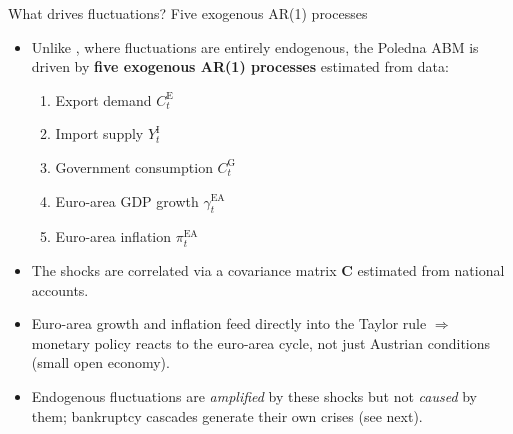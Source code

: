 \documentclass[9pt]{beamer}
\begin{document}
\begin{frame}{What drives fluctuations? Five exogenous AR(1) processes}
    \begin{itemize}
        \item Unlike \cite{assenza_emergent_2015}, where fluctuations are entirely endogenous, the Poledna ABM is driven by \textbf{five exogenous AR(1) processes} estimated from data:
        \begin{enumerate}\footnotesize
            \item Export demand $C^{\mathrm{E}}_t$
            \item Import supply $Y^{\mathrm{I}}_t$
            \item Government consumption $C^{\mathrm{G}}_t$
            \item Euro-area GDP growth $\gamma^{\mathrm{EA}}_t$
            \item Euro-area inflation $\pi^{\mathrm{EA}}_t$
        \end{enumerate}
        \item The shocks are correlated via a covariance matrix $\mathbf{C}$ estimated from national accounts.
        \item Euro-area growth and inflation feed directly into the Taylor rule $\Rightarrow$ monetary policy reacts to the euro-area cycle, not just Austrian conditions (small open economy).
        \item Endogenous fluctuations are \emph{amplified} by these shocks but not \emph{caused} by them; bankruptcy cascades generate their own crises (see next).
    \end{itemize}
\end{frame}
\end{document}
